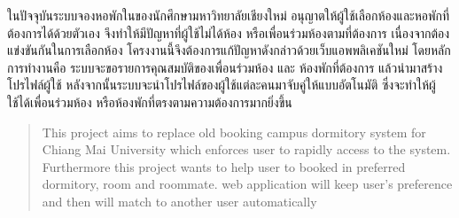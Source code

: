 \maketitle
\makesignature

\ifproject
  \begin{abstractTH}
    
    ในปัจจุบันระบบจองหอพักในของนักศึกษามหาวิทยาลัยเชียงใหม่ อนุญาตให้ผู้ใช้เลือกห้องและหอพักที่ต้องการได้ด้วยตัวเอง
    จึงทำให้มีปัญหาที่ผู้ใช้ไม่ได้ห้อง หรือเพื่อนร่วมห้องตามที่ต้องการ เนื่องจากต้องแข่งขันกันในการเลือกห้อง 
    โครงงานนี้จึงต้องการแก้ปัญหาดังกล่าวด้วยเว็บแอพพลิเคชันใหม่ โดยหลักการทำงานคือ 
    ระบบจะขอรายการคุณสมบัติของเพื่อนร่วมห้อง และ ห้องพักที่ต้องการ แล้วนำมาสร้างโปรไฟล์ผู้ใช้ 
    หลังจากนั้นระบบจะนำโปรไฟล์ของผู้ใช้แต่ละคนมาจับคู่ให้แบบอัตโนมัติ ซึ่งจะทำให้ผู้ใช้ได้เพื่อนร่วมห้อง 
    หรือห้องพักที่ตรงตามความต้องการมากยิ่งขึ้น 
    

    
  \end{abstractTH}
  
  \begin{abstract}
    
    This project aims to replace old booking campus dormitory system for 
    Chiang Mai University which enforces user to rapidly access to the system.
    Furthermore this project wants to help user to booked in preferred dormitory, room and roommate.
    web application will keep user's preference and then will match to another user automatically
    
  \end{abstract}
  

